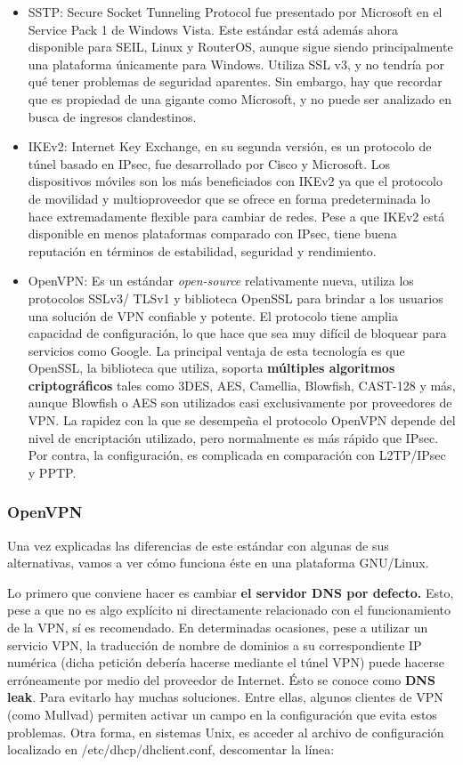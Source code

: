 \begin{itemize}
 	\item SSTP: Secure Socket Tunneling Protocol fue presentado por Microsoft en el Service Pack 1 de Windows Vista. Este estándar está además ahora disponible para SEIL, Linux y RouterOS, aunque sigue siendo principalmente una plataforma únicamente para Windows. 
 	Utiliza SSL v3, y no tendría por qué tener problemas de seguridad aparentes. Sin embargo, hay que recordar que es propiedad de una gigante como Microsoft, y no puede ser analizado en busca de ingresos clandestinos.
 	
 	\item IKEv2: Internet Key Exchange, en su segunda versión, es un protocolo de túnel basado en IPsec, fue desarrollado por Cisco y Microsoft.
 	Los dispositivos móviles son los más beneficiados con IKEv2 ya que el protocolo de movilidad y multioproveedor que se ofrece en forma predeterminada lo hace extremadamente flexible para cambiar de redes. Pese a que IKEv2 está disponible en menos plataformas comparado con IPsec, tiene buena reputación en términos de estabilidad, seguridad y rendimiento.
 	
 	\item OpenVPN: Es un estándar \textit{open-source }relativamente nueva, utiliza los protocolos SSLv3/ TLSv1 y biblioteca OpenSSL para brindar a los usuarios una solución de VPN confiable y potente. El protocolo tiene amplia capacidad de configuración, lo que hace que sea muy difícil de bloquear para servicios como Google.	La principal ventaja de esta tecnología es que OpenSSL, la biblioteca que utiliza, soporta\textbf{ múltiples algoritmos criptográficos }tales como 3DES, AES, Camellia, Blowfish, CAST-128 y más, aunque Blowfish o AES son utilizados casi exclusivamente por proveedores de VPN.
 	La rapidez con la que se desempeña el protocolo OpenVPN depende del nivel de encriptación utilizado, pero normalmente es más rápido que IPsec. Por contra, la configuración, es complicada en comparación con L2TP/IPsec y PPTP.
 \end{itemize}
 
 \subsubsection{OpenVPN}
 
	Una vez explicadas las diferencias de este estándar con algunas de sus alternativas, vamos a ver cómo funciona éste en una plataforma GNU/Linux.
	
	Lo primero que conviene hacer es cambiar \textbf{el servidor DNS por defecto.}
	Esto, pese a que no es algo explícito ni directamente relacionado con el funcionamiento de la VPN, sí es recomendado. En determinadas ocasiones, pese a utilizar un servicio VPN, la traducción de nombre de dominios a su correspondiente IP numérica (dicha petición debería hacerse mediante el túnel VPN) puede hacerse erróneamente por medio del proveedor de Internet. Ésto se conoce como \textbf{DNS leak}. 
	Para evitarlo hay muchas soluciones. Entre ellas, algunos clientes de VPN (como Mullvad) permiten activar un campo en la configuración que evita estos problemas. Otra forma, en sistemas Unix, es acceder al archivo de configuración localizado en /etc/dhcp/dhclient.conf, descomentar la línea:
	
